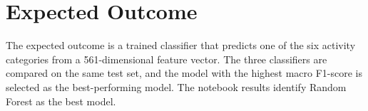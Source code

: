 \section{Expected Outcome}
The expected outcome is a trained classifier that predicts one of the six activity categories from a 561-dimensional feature vector. The three classifiers are compared on the same test set, and the model with the highest macro F1-score is selected as the best-performing model. The notebook results identify Random Forest as the best model.
